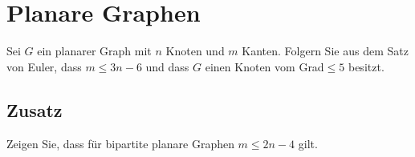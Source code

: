 \section{Planare Graphen}
	Sei $G$ ein planarer Graph mit $n$ Knoten und $m$ Kanten. Folgern Sie aus dem Satz von Euler, dass $m\leq3n-6$ und dass $G$ einen Knoten vom Grad$\leq5$ besitzt.
\subsection*{Zusatz}
	Zeigen Sie, dass für bipartite planare Graphen $m\leq2n-4$ gilt.
